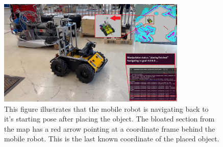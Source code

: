 \begin{figure}[H]
  \centering
  \includegraphics[width = 0.8\textwidth]{Figures/figHuskyFinalExperiment5.png}
  \caption{This figure illustrates that the mobile robot is navigating back to it's starting pose after placing the object. The bloated section from the map has a red arrow pointing at a coordinate frame behind the mobile robot. This is the last known coordinate of the placed object.}
  \label{fig:R:WA:finalExperiment5}
\end{figure}














